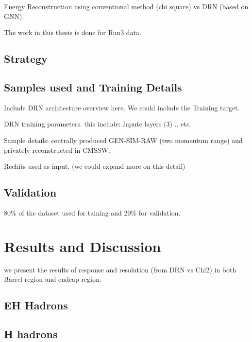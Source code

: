 Energy Reconstruction using conventional method (chi square) vs DRN (based on GNN).

The work in this thesis is done for Run3 data. 


\subsection{Strategy}


\subsection{Samples used and Training Details}

Include DRN architecture overview here. We could include the Training target.  

DRN training parameters. this include: Inpute layers (3) .. etc.

Sample details: centrally produced GEN-SIM-RAW (two momentum range) and privately reconstructed in CMSSW.

Rechits used as input. (we could expand more on this detail)

\subsection{Validation}

80\% of the dataset used for taining and 20\% for validation.  

\section{Results and Discussion}

we present the results of response and resolution (from DRN vs Chi2) in  both Barrel region and endcap region.  
  \subsection{EH Hadrons}
  \subsection{H hadrons} 



